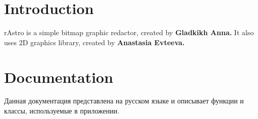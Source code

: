 \hypertarget{index_intro_sec}{}\section{Introduction}\label{index_intro_sec}
r\+Astro is a simple bitmap graphic redactor, created by {\bfseries Gladkikh Anna.} It also uses 2\+D graphics library, created by {\bfseries Anastasia Evteeva.} \hypertarget{index_doc_sec}{}\section{Documentation}\label{index_doc_sec}
Данная документация представлена на русском языке и описывает функции и классы, используемые в приложении. 